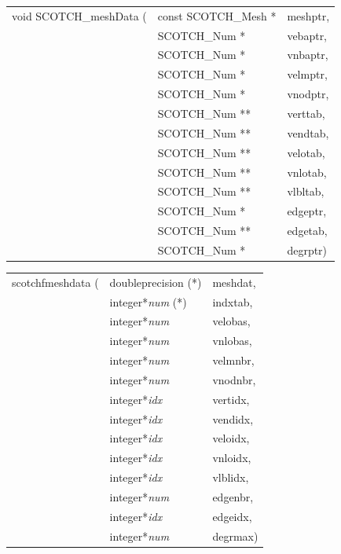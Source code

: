 \begin{itemize}
\progsyn

{\tt\begin{tabular}{l@{}ll}
void SCOTCH\_meshData ( & const SCOTCH\_Mesh * & meshptr, \\
                        & SCOTCH\_Num *        & vebaptr, \\
                        & SCOTCH\_Num *        & vnbaptr, \\
                        & SCOTCH\_Num *        & velmptr, \\
                        & SCOTCH\_Num *        & vnodptr, \\
                        & SCOTCH\_Num **       & verttab, \\
                        & SCOTCH\_Num **       & vendtab, \\
                        & SCOTCH\_Num **       & velotab, \\
                        & SCOTCH\_Num **       & vnlotab, \\
                        & SCOTCH\_Num **       & vlbltab, \\
                        & SCOTCH\_Num *        & edgeptr, \\
                        & SCOTCH\_Num **       & edgetab, \\
                        & SCOTCH\_Num *        & degrptr)
\end{tabular}}

{\tt\begin{tabular}{l@{}ll}
scotchfmeshdata ( & doubleprecision (*)   & meshdat, \\
                  & integer*{\it num} (*) & indxtab, \\
                  & integer*{\it num}     & velobas, \\
                  & integer*{\it num}     & vnlobas, \\
                  & integer*{\it num}     & velmnbr, \\
                  & integer*{\it num}     & vnodnbr, \\
                  & integer*{\it idx}     & vertidx, \\
                  & integer*{\it idx}     & vendidx, \\
                  & integer*{\it idx}     & veloidx, \\
                  & integer*{\it idx}     & vnloidx, \\
                  & integer*{\it idx}     & vlblidx, \\
                  & integer*{\it num}     & edgenbr, \\
                  & integer*{\it idx}     & edgeidx, \\
                  & integer*{\it num}     & degrmax)
\end{tabular}}


\end{itemize}
